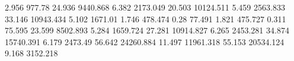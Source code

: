 2.956      977.78     %
24.936     9440.868   %
6.382      2173.049   %
20.503     10124.511  %
5.459      2563.833   %
33.146     10943.434  %
5.102      1671.01    %
1.746      478.474    %
0.28       77.491     %
1.821      475.727    %
0.311      75.595     %
23.599     8502.893   %
5.284      1659.724   %
27.281     10914.827  %
6.265      2453.281   %
34.874     15740.391  %
6.179      2473.49    %
56.642     24260.884  %
11.497     11961.318  %
55.153     20534.124  %
9.168      3152.218   %
